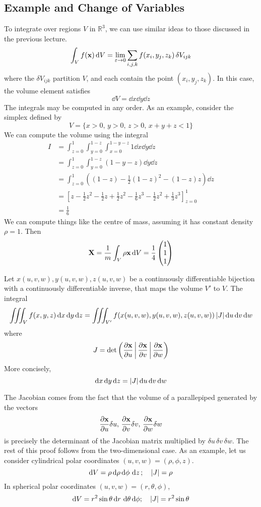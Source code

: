 \documentclass{article}
\begin{document}
\subsection{Example and Change of Variables}
To integrate over regions $V$ in $\mathbb R^3$, we can use similar ideas to those discussed in the previous lecture.
\[ \int_V f(\vb x) \dd{V} = \lim_{\varepsilon \to 0} \sum_{i,j,k} f(x_i, y_j, z_k) \,\delta V_{ijk} \]
where the $\delta V_{ijk}$ partition $V$, and each contain the point $(x_i, y_j, z_k)$. In this case, the volume element satisfies
\[ \dd{V} = \dd{x}\dd{y}\dd{z} \]
The integrals may be computed in any order. As an example, consider the simplex defined by
\[ V = \{ x > 0,\, y > 0,\, z > 0,\, x+y+z < 1 \} \]
We can compute the volume using the integral
\begin{align*}
	I & = \int_{z=0}^1 \int_{y=0}^{1-z} \int_{x=0}^{1-y-z} 1 \dd{x}\dd{y}\dd{z}                                                        \\
	  & = \int_{z=0}^1 \int_{y=0}^{1-z} (1-y-z)\dd{y}\dd{z}                                                                            \\
	  & = \int_{z=0}^1 \left((1-z) - \frac{1}{2}(1-z)^2 - (1-z)z\right) \dd{z}                                                         \\
	  & = \left[ z - \frac{1}{2}z^2 - \frac{1}{2}z + \frac{1}{2}z^2 - \frac{1}{6}z^3 - \frac{1}{2}z^2 + \frac{1}{3}z^3 \right]_{z=0}^1 \\
	  & = \frac{1}{6}
\end{align*}
We can compute things like the centre of mass, assuming it has constant density $\rho = 1$. Then
\[ \vb X = \frac{1}{m} \int_V \rho \vb x \dd{V} = \frac{1}{4}\begin{pmatrix}
		1 \\1\\1
	\end{pmatrix} \]
\begin{proposition}
	Let $x(u, v, w), y(u, v, w), z(u, v, w)$ be a continuously differentiable bijection with a continuously differentiable inverse, that maps the volume $V'$ to $V$. The integral
	\[ \iiint_V f(x, y, z)\dd{x}\dd{y}\dd{z} = \iiint_{V'} f(x(u, v, w), y(u, v, w), z(u, v, w))\,\abs{J}\dd{u}\dd{v}\dd{w} \]
	where
	\[ J = \det\left( \frac{\partial \vb x}{\partial u} \,\middle|\, \frac{\partial \vb x}{\partial v} \,\middle|\, \frac{\partial \vb x}{\partial w} \right) \]
	More concisely,
	\[ \dd{x}\dd{y}\dd{z} = \abs{J}\dd{u}\dd{v}\dd{w} \]
\end{proposition}
\noindent The Jacobian comes from the fact that the volume of a parallepiped generated by the vectors
\[ \frac{\partial \vb x}{\partial u} \delta u,\,\frac{\partial \vb x}{\partial v} \delta v,\,\frac{\partial \vb x}{\partial w} \delta w \]
is precisely the determinant of the Jacobian matrix multiplied by $\delta u\,\delta v\,\delta w$. The rest of this proof follows from the two-dimensional case. As an example, let us consider cylindrical polar coordinates $(u, v, w) = (\rho, \phi, z)$.
\[ \dd{V} = \rho \, \dd \rho \, \dd \phi \, \dd{z};\quad \abs{J} = \rho \]
In spherical polar coordinates $(u, v, w) = (r, \theta, \phi)$,
\[ \dd{V} = r^2 \sin\theta \dd{r} \,\dd \theta \,\dd \phi;\quad \abs{J} = r^2\sin\theta \]
\end{document}

